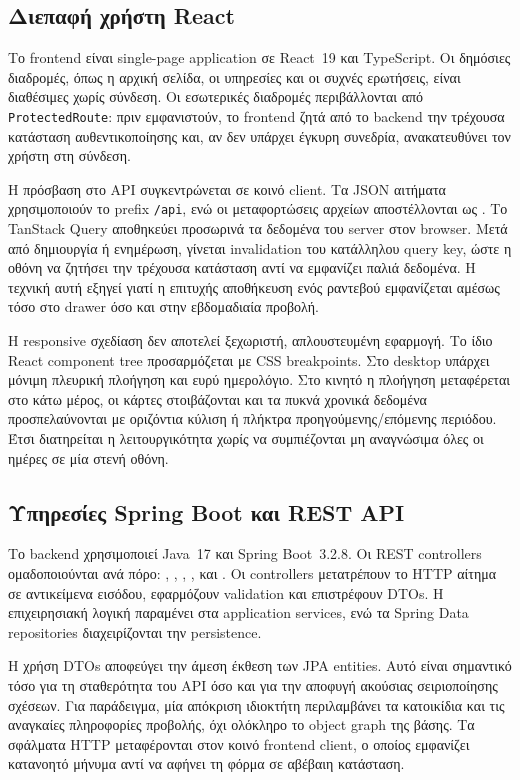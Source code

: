 \subsection{Διεπαφή χρήστη React}

Το frontend είναι single-page application σε React~19 και TypeScript. Οι
δημόσιες διαδρομές, όπως η αρχική σελίδα, οι υπηρεσίες και οι συχνές
ερωτήσεις, είναι διαθέσιμες χωρίς σύνδεση. Οι εσωτερικές διαδρομές
περιβάλλονται από \texttt{ProtectedRoute}: πριν εμφανιστούν, το frontend
ζητά από το backend την τρέχουσα κατάσταση αυθεντικοποίησης και, αν δεν
υπάρχει έγκυρη συνεδρία, ανακατευθύνει τον χρήστη στη σύνδεση.

Η πρόσβαση στο API συγκεντρώνεται σε κοινό client. Τα JSON αιτήματα
χρησιμοποιούν το prefix \texttt{/api}, ενώ οι μεταφορτώσεις αρχείων
αποστέλλονται ως . Το TanStack Query αποθηκεύει
προσωρινά τα δεδομένα του server στον browser. Μετά από δημιουργία ή
ενημέρωση, γίνεται invalidation του κατάλληλου query key, ώστε η οθόνη να
ζητήσει την τρέχουσα κατάσταση αντί να εμφανίζει παλιά δεδομένα. Η τεχνική
αυτή εξηγεί γιατί η επιτυχής αποθήκευση ενός ραντεβού εμφανίζεται αμέσως τόσο
στο drawer όσο και στην εβδομαδιαία προβολή.

Η responsive σχεδίαση δεν αποτελεί ξεχωριστή, απλουστευμένη εφαρμογή. Το ίδιο
React component tree προσαρμόζεται με CSS breakpoints. Στο desktop υπάρχει
μόνιμη πλευρική πλοήγηση και ευρύ ημερολόγιο. Στο κινητό η πλοήγηση
μεταφέρεται στο κάτω μέρος, οι κάρτες στοιβάζονται και τα πυκνά χρονικά
δεδομένα προσπελαύνονται με οριζόντια κύλιση ή πλήκτρα προηγούμενης/επόμενης
περιόδου. Έτσι διατηρείται η λειτουργικότητα χωρίς να συμπιέζονται μη
αναγνώσιμα όλες οι ημέρες σε μία στενή οθόνη.

\subsection{Υπηρεσίες Spring Boot και REST API}

Το backend χρησιμοποιεί Java~17 και Spring Boot~3.2.8. Οι REST controllers
ομαδοποιούνται ανά πόρο: ,
, ,
,  και
. Οι controllers μετατρέπουν το HTTP αίτημα σε
αντικείμενα εισόδου, εφαρμόζουν validation και επιστρέφουν DTOs. Η
επιχειρησιακή λογική παραμένει στα application services, ενώ τα Spring Data
repositories διαχειρίζονται την persistence.

Η χρήση DTOs αποφεύγει την άμεση έκθεση των JPA entities. Αυτό είναι
σημαντικό τόσο για τη σταθερότητα του API όσο και για την αποφυγή ακούσιας
σειριοποίησης σχέσεων. Για παράδειγμα, μία απόκριση ιδιοκτήτη περιλαμβάνει τα
κατοικίδια και τις αναγκαίες πληροφορίες προβολής, όχι ολόκληρο το object
graph της βάσης. Τα σφάλματα HTTP μεταφέρονται στον κοινό frontend client,
ο οποίος εμφανίζει κατανοητό μήνυμα αντί να αφήνει τη φόρμα σε αβέβαιη
κατάσταση.

